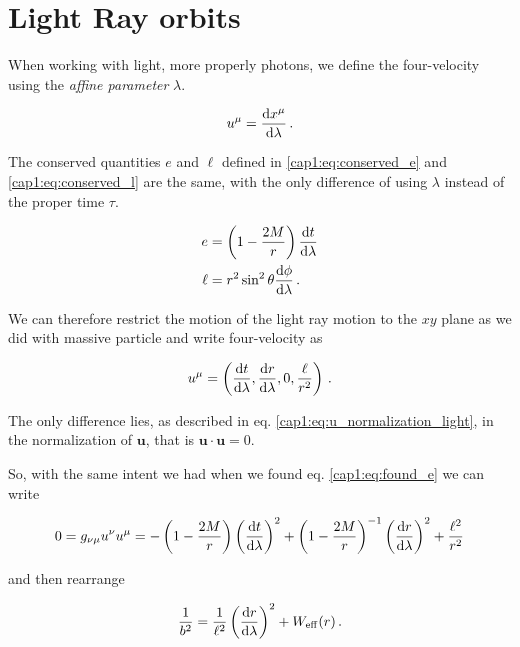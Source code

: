
\newpage


\section{Light Ray orbits}

When working with light, more properly photons, we define the four-velocity
using the \textit{affine parameter} $\lambda$.

\begin{equation*}
    u^\mu = \dv{x^\mu}{\lambda} \, .
\end{equation*}

The conserved quantities $e$ and $\ell$ defined in \ref{cap1:eq:conserved_e} and
\ref{cap1:eq:conserved_l} are the same, with the only difference of using
$\lambda$ instead of the proper time $\tau$.

\begin{subequations}
    \begin{align*}
        e &= \left( 1 - \frac{2M}{r} \right) \dv{t}{\lambda} \\
        \ell &= r^2 \sin^2 \theta \dv{\phi}{\lambda} \, .
    \end{align*}
\end{subequations}

We can therefore restrict the motion of the light ray motion to the $xy$ plane
as we did with massive particle and write four-velocity as

\begin{equation*}
    u^\mu
    = \left(\dv{t}{\lambda}, \dv{r}{\lambda}, 0, \frac{\ell}{r^2} \right) \, .
\end{equation*}

The only difference lies, as described in eq.
\ref{cap1:eq:u_normalization_light}, in the normalization of $\mathbf u$, that
is $\mathbf{u \cdot u} = 0$.

So, with the same intent we had when we found eq. \ref{cap1:eq:found_e} we can
write

\begin{equation*}
    0 = g_{\nu \mu} u^\nu u^\mu =
    - \left(1 - \frac{2M}{r} \right) \left(\dv{t}{\lambda} \right)^2
    + \left(1 - \frac{2M}{r} \right)^{- 1} \left(\dv{r}{\lambda} \right)^2
    + \frac{\ell^2}{r^2}
\end{equation*}

and then rearrange

\begin{equation}
    \frac{1}{b^2} = \frac{1}{\ell^2} \left( \dv{r}{\lambda} \right)^2
    + W_{\rm eff} (r) \, .
    \label{cap1:eq:found_b}
\end{equation}

